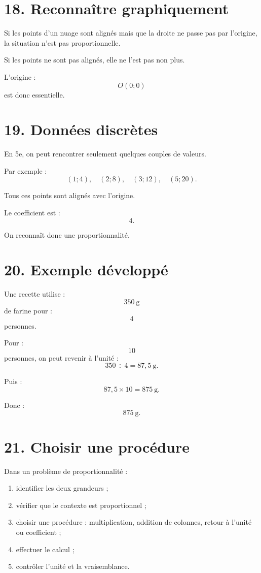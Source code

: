 \section{18. Reconnaître graphiquement}

Si les points d'un nuage sont alignés mais que la droite ne passe pas par l'origine, la situation n'est pas proportionnelle.

Si les points ne sont pas alignés, elle ne l'est pas non plus.

L'origine :
\[
O(0;0)
\]
est donc essentielle.

\section{19. Données discrètes}

En 5e, on peut rencontrer seulement quelques couples de valeurs.

Par exemple :
\[
(1;4),\quad(2;8),\quad(3;12),\quad(5;20).
\]

Tous ces points sont alignés avec l'origine.

Le coefficient est :
\[
4.
\]

On reconnaît donc une proportionnalité.

\section{20. Exemple développé}

Une recette utilise :
\[
350\ \text{g}
\]
de farine pour :
\[
4
\]
personnes.

Pour :
\[
10
\]
personnes, on peut revenir à l'unité :
\[
350\div4=87{,}5\ \text{g}.
\]

Puis :
\[
87{,}5\times10=875\ \text{g}.
\]

Donc :
\[
\boxed{875\ \text{g}}.
\]

\section{21. Choisir une procédure}

\begin{methode}
Dans un problème de proportionnalité :
\begin{enumerate}
\item identifier les deux grandeurs ;
\item vérifier que le contexte est proportionnel ;
\item choisir une procédure : multiplication, addition de colonnes, retour à l'unité ou coefficient ;
\item effectuer le calcul ;
\item contrôler l'unité et la vraisemblance.
\end{enumerate}
\end{methode}

